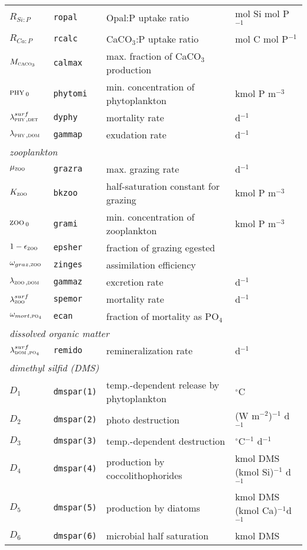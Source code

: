 \documentclass[11pt,a4paper,fleqn,twoside]{article}
\def\pho{\text{\textsc{po$_4$}}\,}
\def\dom{\text{\textsc{dom}}\,}
\def\phy{\text{\textsc{phy}}\,}
\def\zoo{\text{\textsc{zoo}}\,}
\def\det{\text{\textsc{det}}\,}
\def\cal{\text{\textsc{caco$_3$}}\,}
\newcommand{\concP}{kmol P m$^{-3}$\,}
\newcommand{\degs}{$^{\circ}$}
\begin{document}
\begin{table}[htb]
\begin{center}
\begin{tabular}{llp{7cm}l}
$R_{Si:P}$&{\tt ropal}& Opal:P uptake ratio & mol Si mol P$^{-1}$\\
$R_{Ca:P}$&{\tt rcalc}& CaCO$_3$:P uptake ratio  & mol C mol P$^{-1}$\\
$M_{\cal}$&{\tt calmax}& max. fraction of CaCO$_3$ production & \\
$\phy_{0}$&{\tt phytomi}& min. concentration of phytoplankton  & \concP \\
$\lambda_{\phy,\det}^{surf}$&{\tt dyphy}& mortality rate & d$^{-1}$\\
$\lambda_{\phy,\dom}$&{\tt gammap}& exudation rate & d$^{-1}$\\
\multicolumn{4}{l}{\rule{0mm}{4mm}\it zooplankton}\\
$\mu_\zoo$ &{\tt grazra}& max. grazing rate & d$^{-1}$\\
$K_{\zoo}$&{\tt bkzoo}& half-saturation constant for grazing & \concP \\
$\zoo_{0}$&{\tt grami}& min. concentration of zooplankton&\concP \\
$1-\epsilon_{\zoo}$&{\tt epsher}& fraction of grazing egested  & \\
$\omega_{graz,\zoo}$&{\tt zinges}& assimilation efficiency & \\
$\lambda_{\zoo,\dom}$&{\tt gammaz}& excretion rate & d$^{-1}$\\
$\lambda_{\zoo}^{surf}$&{\tt spemor}& mortality rate & d$^{-1}$\\
$\omega_{mort,\pho}$&{\tt ecan}& fraction of mortality as PO$_4$& \\
\multicolumn{4}{l}{\rule{0mm}{4mm}\it dissolved organic matter}\\
$\lambda_{\dom,\pho}^{surf}$&{\tt remido}& remineralization rate & d$^{-1}$\\ 
\multicolumn{4}{l}{\rule{0mm}{4mm}\it dimethyl silfid (DMS)}\\
$D_1$ & {\tt dmspar(1)}& temp.-dependent release by phytoplankton& \degs C\\
$D_2$ & {\tt dmspar(2)}& photo destruction& (W m$^{-2}$)$^{-1}$ d$^{-1}$\\
$D_3$ & {\tt dmspar(3)}&  temp.-dependent destruction & \degs C$^{-1}$ d$^{-1}$\\
$D_4$ & {\tt dmspar(4)}& production by coccolithophorides  & kmol DMS (kmol Si)$^{-1}$ d$^{-1}$\\
$D_5$ & {\tt dmspar(5)}& production by diatoms  & kmol DMS (kmol Ca)$^{-1}$d$^{-1}$\\
$D_6$ & {\tt dmspar(6)}& microbial half saturation & kmol DMS \\

\end{tabular}
\end{center}
\end{table}
\end{document}
